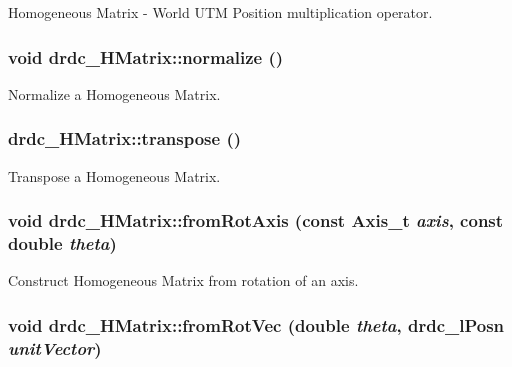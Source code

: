 Homogeneous Matrix - World UTM Position multiplication operator. 

\hypertarget{classdrdc__HMatrix_b123740bea69ad0119682771d0cce7a5}{
\subsubsection[normalize]{\setlength{\rightskip}{0pt plus 5cm}void drdc\_\-HMatrix::normalize ()}}
\label{classdrdc__HMatrix_b123740bea69ad0119682771d0cce7a5}


Normalize a Homogeneous Matrix. 

\hypertarget{classdrdc__HMatrix_9d8593f3e84fb400bfd27dc48e137934}{
\subsubsection[transpose]{ drdc\_\-HMatrix::transpose ()}}
\label{classdrdc__HMatrix_9d8593f3e84fb400bfd27dc48e137934}


Transpose a Homogeneous Matrix. 

\hypertarget{classdrdc__HMatrix_c51b27e0651263aacb0aee7c7815f5e6}{
\subsubsection[fromRotAxis]{\setlength{\rightskip}{0pt plus 5cm}void drdc\_\-HMatrix::fromRotAxis (const {\bf Axis\_\-t} {\em axis}, \/  const double {\em theta})}}
\label{classdrdc__HMatrix_c51b27e0651263aacb0aee7c7815f5e6}


Construct Homogeneous Matrix from rotation of an axis. 

\hypertarget{classdrdc__HMatrix_c96a446ac4ed830ae94ea7259d711788}{
\subsubsection[fromRotVec]{\setlength{\rightskip}{0pt plus 5cm}void drdc\_\-HMatrix::fromRotVec (double {\em theta}, \/  {\bf drdc\_\-lPosn} {\em unitVector})}}
\label{classdrdc__HMatrix_c96a446ac4ed830ae94ea7259d711788}


